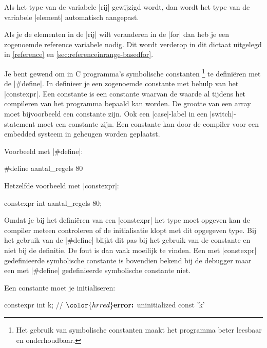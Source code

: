 \begin{cpplstShortInline}
Als het type van de variabele |rij| gewijzigd wordt, dan wordt het type van de variabele |element| automatisch aangepast.

Als je de elementen in de |rij| wilt veranderen in de  |for| dan heb je een zogenoemde reference variabele nodig. Dit wordt verderop in dit dictaat uitgelegd in \cref{reference} en \cref{sec:referenceinrange-basedfor}.

\label{sec:constexpr}
Je bent gewend om in C programma's symbolische constanten%
\footnote{%
    Het gebruik van symbolische constanten maakt het programma beter leesbaar en onderhoudbaar.
} te definiëren met de  |#define|.
In \Cpp{} definieer je een zogenoemde  constante met behulp van het  |constexpr|.
Een  constante is een constante waarvan de waarde al tijdens het compileren van het programma bepaald kan worden. 
De grootte van een array moet bijvoorbeeld een  constante zijn. 
Ook een |case|-label in een |switch|\hyp{}statement moet een  constante zijn.
Een  constante kan door de compiler voor een embedded systeem in  geheugen worden geplaatst.

Voorbeeld met |#define|:
\begin{cpplstfragment}
#define aantal_regels 80
\end{cpplstfragment}

Hetzelfde voorbeeld met |constexpr|:
\begin{cpplstfragment}
constexpr int aantal_regels {80};
\end{cpplstfragment}

Omdat je bij het definiëren van een |constexpr| het type moet opgeven kan de compiler meteen controleren of de initialisatie klopt met dit opgegeven type.
Bij het gebruik van de  |#define| blijkt dit pas bij het gebruik van de constante en niet bij de definitie. 
De fout is dan vaak moeilijk te vinden.
Een met |constexpr| gedefinieerde symbolische constante is bovendien bekend bij de debugger maar een met |#define| gedefinieerde symbolische constante niet.


Een  constante moet je initialiseren:
\begin{cpplstfragment}[mathescape=true]
constexpr int k;
//  $\color{hrred}\textbf{error:}$ uninitialized const 'k'
\end{cpplstfragment}


\end{cpplstShortInline}

